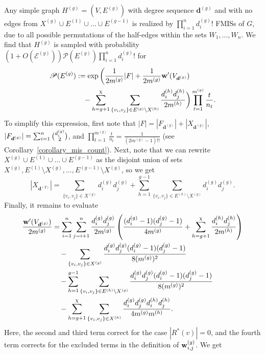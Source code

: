 \documentclass{article}
\theoremstyle{plain}
\theoremstyle{remark}
\theoremstyle{plain}
\numberwithin{equation}{section}
\renewcommand{\d}{{\boldsymbol{d}}}
\renewcommand{\b}{{\bf{w}}}
\begin{document}
	Any simple graph $H^{(g)}=(V,E^{(g)})$ with degree sequence $\d^{(g)}$ and with no edges from $X^{(g)}\cup E^{(1)}\cup\ldots\cup E^{(g-1)}$ is realized by $\prod_{i=1}^{n}d_i^{(g)}!$ FMISs of $G$, due to all possible permutations of the half-edges within the sets $W_1,\ldots,W_n$. We find that $H^{(g)}$ is sampled with probability $(1+O(\mathscr{E}^{(g)}))\mathscr{P}(E^{(g)})\prod_{i=1}^{n}d_i^{(g)}!$ for
	\begin{align}
		\mathscr{P}(E^{(g)})&:=\exp\bigg(\frac1{2m^{(g)}}|F|+\frac1{2m^{(g)}}\b'(V_{\d^{(g)}})\bigg.
		\\&\quad\bigg.-\sum_{h=g+1}^{\chi}\sum_{\{v_i,v_j\}\in E^{(g)}\setminus X^{(h)}}\frac{d_i^{(h)}d_j^{(h)}}{2m^{(h)}}\bigg)\prod_{t=1}^{m^{(g)}}\frac{t}{n_t}.
	\end{align}
	To simplify this expression, first note that $|F|=|F_{\d^{(g)}}|+|X_{\d^{(g)}}|$, $|F_{\d^{(g)}}|=\sum_{i=1}^{n}\tbinom{d_i^{(g)}}{2}$, and $\prod_{t=1}^{m^{(g)}}\tfrac{t}{n_t}=\tfrac1{(2m^{(g)}-1)!!}$ (see Corollary~\ref{corollary_mis_count}). Next, note that we can rewrite $X^{(g)}\cup E^{(1)}\cup\ldots\cup E^{(g-1)}$ as the disjoint union of sets $X^{(g)},E^{(1)}\setminus X^{(g)},\ldots,E^{(g-1)}\setminus X^{(g)}$, so we get $$|X_{\d^{(g)}}|=\sum_{\{v_i,v_j\}\in X^{(g)}}d_i^{(g)}d_j^{(g)}+\sum_{h=1}^{g-1}\sum_{\{v_i,v_j\}\in E^{(h)}\setminus X^{(g)}}d_i^{(g)}d_j^{(g)}.$$ Finally, it remains to evaluate
	\begin{align}
		\frac{\b'(V_{\d^{(g)}})}{2m^{(g)}}&=\sum_{i=1}^{n}\sum_{j=i+1}^{n}\frac{d_i^{(g)}d_j^{(g)}}{2m^{(g)}}\left(\frac{(d_i^{(g)}-1)(d_j^{(g)}-1)}{4m^{(g)}}+\sum_{h=g+1}^{\chi}\frac{d_i^{(h)}d_j^{(h)}}{2m^{(h)}}\right)
		\\&\quad-\sum_{\{v_i,v_j\}\in X^{(g)}}\frac{d_i^{(g)}d_j^{(g)}(d_i^{(g)}-1)(d_j^{(g)}-1)}{8(m^{(g)})^2}
		\\&\quad-\sum_{h=1}^{g-1}\sum_{\{v_i,v_j\}\in E^{(h)}\setminus X^{(g)}}\frac{d_i^{(g)}d_j^{(g)}(d_i^{(g)}-1)(d_j^{(g)}-1)}{8(m^{(g)})^2}
		\\&\quad-\sum_{h=g+1}^{\chi}\sum_{\{v_i,v_j\}\in X^{(h)}}\frac{d_i^{(g)}d_j^{(g)}d_i^{(h)}d_j^{(h)}}{4m^{(g)}m^{(h)}}.
	\end{align}
	Here, the second and third term correct for the case $|R^*(v)|=0$, and the fourth term corrects for the excluded terms in the definition of $\b_{i,j}^{(g)}$. We get
\end{document}
